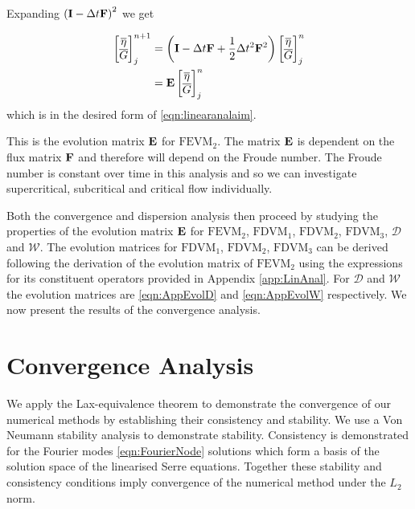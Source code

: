 Expanding $\left(\mathbf{I} - \Delta t\mathbf{F} \right)^2$ we get

\begin{align}
\begin{bmatrix}
\overline{\eta} \\ \overline{G}
\end{bmatrix}^{n+1}_j &= \left(\mathbf{I}  -\Delta t\mathbf{F} + \frac{1}{2}\Delta t^2\mathbf{F}^2 \right) \begin{bmatrix}
\overline{\eta} \\ \overline{G}
\end{bmatrix}^{n}_j \nonumber\\ &=  \mathbf{E}\begin{bmatrix}
\overline{\eta} \\ \overline{G}
\end{bmatrix}^{n}_j
\label{eqn:evolutionmatrix}
\end{align}
which is in the desired form of \eqref{eqn:linearanalaim}.

This is the evolution matrix $\mathbf{E}$ for $\text{FEVM}_2$. The matrix $\mathbf{E}$ is dependent on the flux matrix $\mathbf{F}$ and therefore will depend on the Froude number. The Froude number is constant over time in this analysis and so we can investigate supercritical, subcritical and critical flow individually.

Both the convergence and dispersion analysis then proceed by studying the properties of the evolution matrix $\mathbf{E}$ for $\text{FEVM}_2$, $\text{FDVM}_1$, $\text{FDVM}_2$, $\text{FDVM}_3$, $\mathcal{D}$ and $\mathcal{W}$. The evolution matrices for $\text{FDVM}_1$, $\text{FDVM}_2$, $\text{FDVM}_3$ can be derived following the derivation of the evolution matrix of $\text{FEVM}_2$ using the expressions for its constituent operators provided in Appendix \ref{app:LinAnal}. For $\mathcal{D}$ and $\mathcal{W}$ the evolution matrices are \eqref{eqn:AppEvolD} and \eqref{eqn:AppEvolW} respectively. We now present the results of the convergence analysis.

\section{Convergence Analysis}
We apply the Lax-equivalence theorem to demonstrate the convergence of our numerical methods by establishing their consistency and stability. We use a Von Neumann stability analysis to demonstrate stability. Consistency is demonstrated for the Fourier modes \eqref{eqn:FourierNode} solutions which form a basis of the solution space of the linearised Serre equations. Together these stability and consistency conditions imply convergence of the numerical method under the $L_2$ norm. 

